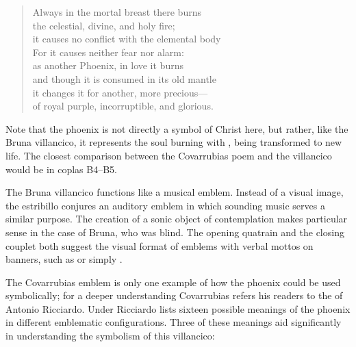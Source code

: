 \begin{verse}
Always in the mortal breast there burns\\
the celestial, divine, and holy fire;\\ 
it causes no conflict with the elemental body\\
For it causes neither fear nor alarm:\\
as another Phoenix, in love it burns\\
and though it is consumed in its old mantle\\
it changes it for another, more precious---\\
of royal purple, incorruptible, and glorious.
\end{verse}
%
Note that the phoenix is not directly a symbol of Christ here, but rather, like the Bruna villancico, it represents the soul burning with , being transformed to new life.
The closest comparison between the Covarrubias poem and the villancico would be in coplas B4--B5.



The Bruna villancico functions like a musical emblem. 
Instead of a visual image, the estribillo conjures an auditory emblem in which sounding music serves a similar purpose. 
The creation of a sonic object of contemplation makes particular sense in the case of Bruna, who was blind.
The opening quatrain and the closing couplet both suggest the visual format of emblems with verbal mottos on banners, such as  or simply .

The Covarrubias emblem is only one example of how the phoenix could be used symbolically; for a deeper understanding Covarrubias refers his readers to the  of Antonio Ricciardo.%
	\autocite{Ricciardo:CommentariaSymbolica}
Under  Ricciardo lists sixteen possible meanings of the phoenix in different emblematic configurations.
Three of these meanings aid significantly in understanding the symbolism of this villancico:

